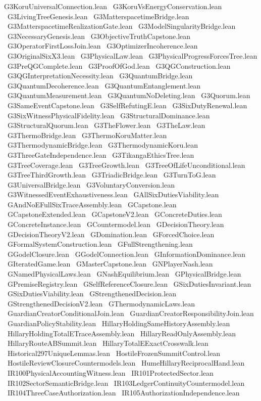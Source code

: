 G3KoruUniversalConnection.lean \
G3KoruVsEnergyConservation.lean \
G3LivingTreeGenesis.lean \
G3MatterspacetimeBridge.lean \
G3MatterspacetimeRealizationGate.lean \
G3ModelSingularityBridge.lean \
G3NecessaryGenesis.lean \
G3ObjectiveTruthCapstone.lean \
G3OperatorFirstLossJoin.lean \
G3OptimizerIncoherence.lean \
G3OriginalSixX3.lean \
G3PhysicalLaw.lean \
G3PhysicalProgressForcesTree.lean \
G3PreQGComplete.lean \
G3ProofOfGod.lean \
G3QGConstruction.lean \
G3QGInterpretationNecessity.lean \
G3QuantumBridge.lean \
G3QuantumDecoherence.lean \
G3QuantumEntanglement.lean \
G3QuantumMeasurement.lean \
G3QuantumNoDeleting.lean \
G3Quorum.lean \
G3SameEventCapstone.lean \
G3SelfRefutingE.lean \
G3SixDutyRenewal.lean \
G3SixWitnessPhysicalFidelity.lean \
G3StructuralDominance.lean \
G3StructuralQuorum.lean \
G3TheFlower.lean \
G3TheLaw.lean \
G3ThermoBridge.lean \
G3ThermoKoruMatter.lean \
G3ThermodynamicBridge.lean \
G3ThermodynamicKoru.lean \
G3ThreeGateIndependence.lean \
G3TikangaEthicsTree.lean \
G3TreeCoverage.lean \
G3TreeGrowth.lean \
G3TreeOfLifeUnconditional.lean \
G3TreeThirdGrowth.lean \
G3TriadicBridge.lean \
G3TurnToG.lean \
G3UniversalBridge.lean \
G3VoluntaryConversion.lean \
G3WitnessedEventExhaustiveness.lean \
GAllSixDutiesViability.lean \
GAndNoEFullSixTraceAssembly.lean \
GCapstone.lean \
GCapstoneExtended.lean \
GCapstoneV2.lean \
GConcreteDuties.lean \
GConcreteInstance.lean \
GCountermodel.lean \
GDecisionTheory.lean \
GDecisionTheoryV2.lean \
GDomination.lean \
GForcedChoice.lean \
GFormalSystemConstruction.lean \
GFullStrengthening.lean \
GGodelClosure.lean \
GGodelConnection.lean \
GInformationDominance.lean \
GIteratedGame.lean \
GMasterCapstone.lean \
GNPlayerNash.lean \
GNamedPhysicalLaws.lean \
GNashEquilibrium.lean \
GPhysicalBridge.lean \
GPremiseRegistry.lean \
GSelfReferenceClosure.lean \
GSixDutiesInvariant.lean \
GSixDutiesViability.lean \
GStrengthenedDecision.lean \
GStrengthenedDecisionV2.lean \
GThermodynamicLaws.lean \
GuardianCreatorConditionalJoin.lean \
GuardianCreatorResponsibilityJoin.lean \
GuardianPolicyStability.lean \
HillaryHoldingSameHistoryAssembly.lean \
HillaryHoldingTotalETraceAssembly.lean \
HillaryReadOnlyAssembly.lean \
HillaryRouteABSummit.lean \
HillaryTotalEExactCrosswalk.lean \
Historical297UniqueLemmas.lean \
HostileFrozenSummitControl.lean \
HostileReviewClosureCountermodels.lean \
HumeHillaryReciprocalHand.lean \
IR100PhysicalAccountingWitness.lean \
IR101ProtectedSector.lean \
IR102SectorSemanticBridge.lean \
IR103LedgerContinuityCountermodel.lean \
IR104ThreeCaseAuthorization.lean \
IR105AuthorizationIndependence.lean \
